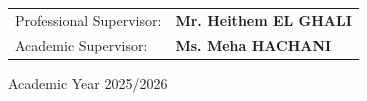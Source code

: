 \vspace{0.25cm}
\begin{flushleft}
\begin{tabular}{p{} p{}}
Professional Supervisor: & \textbf{Mr. Heithem EL GHALI} \\[0.5cm]
Academic Supervisor:     & \textbf{Ms. Meha HACHANI} \\
\end{tabular}
\end{flushleft}

\vskip0.4cm
\begin{center}
\large Academic Year 2025/2026
\end{center}
